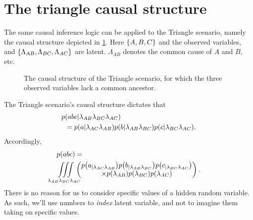 \section{The triangle causal structure}

The same causal inference logic can be applied to the Triangle scenario, namely the causal structure depicted in \cref{fig:TriDAG}. Here $\left\lbrace A,B,C\right\rbrace$ and the observed variables, and  $\left\lbrace\Lambda_{AB},\Lambda_{BC},\Lambda_{AC}\right\rbrace$ are latent. $\Lambda_{AB}$ denotes the common cause of $A$ and $B$, etc. 


\begin{figure}[!t]
\caption{The causal structure of the Triangle scenario, for which the three observed variables lack a common ancestor.}
 \label{fig:TriDAG}
\end{figure}


The Triangle scenario's causal structure dictates that
\begin{align}\begin{split}\label{eq:tristructure}
p&\parens{abc|\lambda_{AB}\lambda_{BC}\lambda_{AC}}\\
&=\p{a|\lambda_{AC}\lambda_{AB}}\p{b|\lambda_{AB}\lambda_{BC}}\p{c|\lambda_{BC}\lambda_{AC}}.
\end{split}\end{align}
Accordingly,
\begin{align}\label{eq:triintegration}
&\p{abc}=\\\nonumber
&\iiint\limits_{\mathclap{\lambda_{AB}\lambda_{BC}\lambda_{AC}}}\,
\begin{pmatrix}\p{a_{|\lambda_{AC}\lambda_{AB}}}\p{b_{|\lambda_{AB}\lambda_{BC}}}\p{c_{|\lambda_{BC}\lambda_{AC}}}\\
\times \p{\lambda_{AB}}\p{\lambda_{BC}}\p{\lambda_{AC}}\end{pmatrix}.
\end{align}
There is no reason for us to consider specific values of a hidden random variable. As such, we'll use numbers to \emph{index} latent variable, and not to imagine them taking on specific values.

